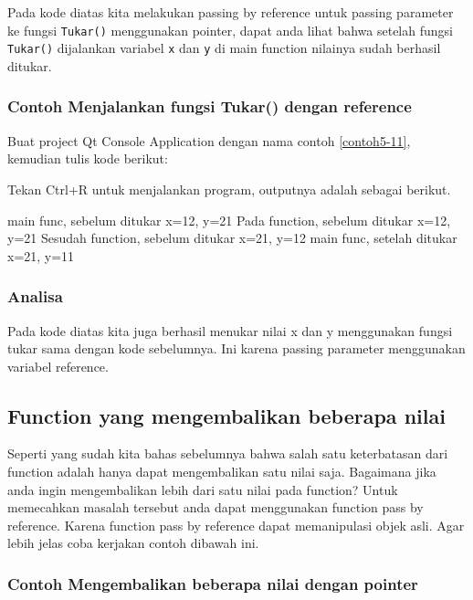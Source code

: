 Pada kode diatas kita melakukan passing by reference untuk passing
parameter ke fungsi \texttt{Tukar()} menggunakan pointer, dapat anda
lihat bahwa setelah fungsi \texttt{Tukar()} dijalankan variabel
\texttt{x} dan \texttt{y} di main function nilainya sudah berhasil
ditukar.

\subsubsection*{Contoh Menjalankan fungsi Tukar() dengan reference}

Buat project Qt Console Application dengan nama contoh \ref{contoh5-11}, kemudian
tulis kode berikut:



Tekan Ctrl+R untuk menjalankan program, outputnya adalah sebagai
berikut.

\begin{lcverbatim}
main func, sebelum ditukar x=12, y=21
Pada function, sebelum ditukar x=12, y=21
Sesudah function, sebelum ditukar x=21, y=12
main func, setelah ditukar x=21, y=11
\end{lcverbatim}

\subsubsection*{Analisa}

Pada kode diatas kita juga berhasil menukar nilai x dan y menggunakan
fungsi tukar sama dengan kode sebelumnya. Ini karena passing parameter
menggunakan variabel reference.

\subsection{Function yang mengembalikan beberapa nilai}\label{function-yang-mengembalikan-beberapa-nilai}

Seperti yang sudah kita bahas sebelumnya bahwa salah satu keterbatasan
dari function adalah hanya dapat mengembalikan satu nilai saja.
Bagaimana jika anda ingin mengembalikan lebih dari satu nilai pada
function? Untuk memecahkan masalah tersebut anda dapat menggunakan
function pass by reference. Karena function pass by reference dapat
memanipulasi objek asli. Agar lebih jelas coba kerjakan contoh dibawah
ini.

\subsubsection*{Contoh Mengembalikan beberapa nilai dengan pointer}

